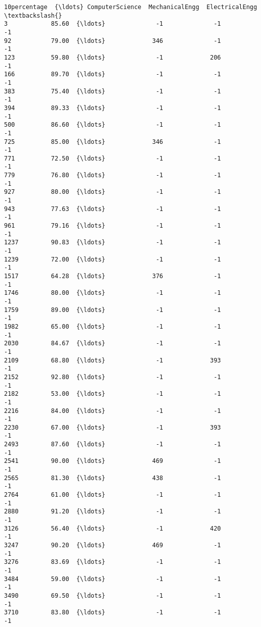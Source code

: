 \documentclass[11pt]{article}
\begin{document}
\begin{tcolorbox}[breakable, size=fbox, boxrule=.5pt, pad at break*=1mm, opacityfill=0]
\begin{Verbatim}[commandchars=\\\{\}]
      10percentage  {\ldots} ComputerScience  MechanicalEngg  ElectricalEngg  \textbackslash{}
3            85.60  {\ldots}              -1              -1              -1
92           79.00  {\ldots}             346              -1              -1
123          59.80  {\ldots}              -1             206              -1
166          89.70  {\ldots}              -1              -1              -1
383          75.40  {\ldots}              -1              -1              -1
394          89.33  {\ldots}              -1              -1              -1
500          86.60  {\ldots}              -1              -1              -1
725          85.00  {\ldots}             346              -1              -1
771          72.50  {\ldots}              -1              -1              -1
779          76.80  {\ldots}              -1              -1              -1
927          80.00  {\ldots}              -1              -1              -1
943          77.63  {\ldots}              -1              -1              -1
961          79.16  {\ldots}              -1              -1              -1
1237         90.83  {\ldots}              -1              -1              -1
1239         72.00  {\ldots}              -1              -1              -1
1517         64.28  {\ldots}             376              -1              -1
1746         80.00  {\ldots}              -1              -1              -1
1759         89.00  {\ldots}              -1              -1              -1
1982         65.00  {\ldots}              -1              -1              -1
2030         84.67  {\ldots}              -1              -1              -1
2109         68.80  {\ldots}              -1             393              -1
2152         92.80  {\ldots}              -1              -1              -1
2182         53.00  {\ldots}              -1              -1              -1
2216         84.00  {\ldots}              -1              -1              -1
2230         67.00  {\ldots}              -1             393              -1
2493         87.60  {\ldots}              -1              -1              -1
2541         90.00  {\ldots}             469              -1              -1
2565         81.30  {\ldots}             438              -1              -1
2764         61.00  {\ldots}              -1              -1              -1
2880         91.20  {\ldots}              -1              -1              -1
3126         56.40  {\ldots}              -1             420              -1
3247         90.20  {\ldots}             469              -1              -1
3276         83.69  {\ldots}              -1              -1              -1
3484         59.00  {\ldots}              -1              -1              -1
3490         69.50  {\ldots}              -1              -1              -1
3710         83.80  {\ldots}              -1              -1              -1


\end{Verbatim}
\end{tcolorbox}
\end{document}
